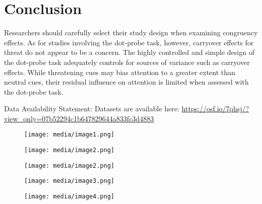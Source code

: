 \documentclass{article}
\begin{document}
	\section{Conclusion}



	Researchers should carefully select their study design when examining congruency effects. As for studies involving the dot-probe task, however, carryover effects for threat do not appear to be a concern. The highly controlled and simple design of the dot-probe task adequately controls for sources of variance such as carryover effects. While threatening cues may bias attention to a greater extent than neutral cues, their residual influence on attention is limited when assessed with the dot-probe task.



	Data Availability Statement:\emph{ }Datasets are available here: \href{https://osf.io/7qhsj/?view_only=07b52294c1b647829644a833fc3d4883}{https://osf.io/7qhsj/?view\_only=07b52294c1b647829644a833fc3d4883}







	\begin{figure}
		\texttt{[image: media/image1.png]}

		\caption{}

		\label{fig:rId11}


	\end{figure}
	\begin{figure}
		\texttt{[image: media/image2.png]}

		\caption{}

		\label{fig:rId12}


	\end{figure}
	\begin{figure}
		\texttt{[image: media/image2.png]}

		\caption{}

		\label{fig:rId12}


	\end{figure}
	\begin{figure}
		\texttt{[image: media/image3.png]}

		\caption{}

		\label{fig:rId13}


	\end{figure}
	\begin{figure}
		\texttt{[image: media/image4.png]}

		\caption{}

		\label{fig:rId14}


	\end{figure}
\end{document}
